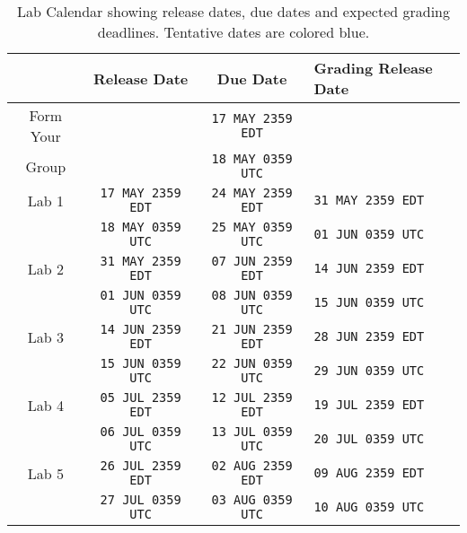 %
\begin{table}
  \centering
  \begin{tabular}{c|c|c|l}
      & Release Date & Due Date & Grading Release Date\\ \hline
    Form Your
      &
      & \texttt{17 MAY 2359 EDT}
      & \\
    Group
      &
      & \texttt{18 MAY 0359 UTC}
      & \\ \hline
    Lab 1
      & \texttt{17 MAY 2359 EDT}
      & \texttt{24 MAY 2359 EDT}
      & {\color{blue}\texttt{31 MAY 2359 EDT}}\\
      & \texttt{18 MAY 0359 UTC}
      & \texttt{25 MAY 0359 UTC}
      & {\color{blue}\texttt{01 JUN 0359 UTC}}\\ \hline
    Lab 2
      & {\color{blue}\texttt{31 MAY 2359 EDT}}
      & {\color{blue}\texttt{07 JUN 2359 EDT}}
      & {\color{blue}\texttt{14 JUN 2359 EDT}}\\
      & {\color{blue}\texttt{01 JUN 0359 UTC}}
      & {\color{blue}\texttt{08 JUN 0359 UTC}}
      & {\color{blue}\texttt{15 JUN 0359 UTC}}\\ \hline
    Lab 3
      & {\color{blue}\texttt{14 JUN 2359 EDT}}
      & {\color{blue}\texttt{21 JUN 2359 EDT}}
      & {\color{blue}\texttt{28 JUN 2359 EDT}}\\
      & {\color{blue}\texttt{15 JUN 0359 UTC}}
      & {\color{blue}\texttt{22 JUN 0359 UTC}}
      & {\color{blue}\texttt{29 JUN 0359 UTC}}\\ \hline
    Lab 4
      & {\color{blue}\texttt{05 JUL 2359 EDT}}
      & {\color{blue}\texttt{12 JUL 2359 EDT}}
      & {\color{blue}\texttt{19 JUL 2359 EDT}}\\
      & {\color{blue}\texttt{06 JUL 0359 UTC}}
      & {\color{blue}\texttt{13 JUL 0359 UTC}}
      & {\color{blue}\texttt{20 JUL 0359 UTC}}\\ \hline
    Lab 5
      & {\color{blue}\texttt{26 JUL 2359 EDT}}
      & {\color{blue}\texttt{02 AUG 2359 EDT}}
      & {\color{blue}\texttt{09 AUG 2359 EDT}}\\
      & {\color{blue}\texttt{27 JUL 0359 UTC}}
      & {\color{blue}\texttt{03 AUG 0359 UTC}}
      & {\color{blue}\texttt{10 AUG 0359 UTC}}
  \end{tabular}
  \caption[Lab Calendar]{%
    Lab Calendar showing release dates, due dates and expected grading
    deadlines. Tentative dates are colored blue.
  }
  \label{tab:labcalendar}
\end{table}
